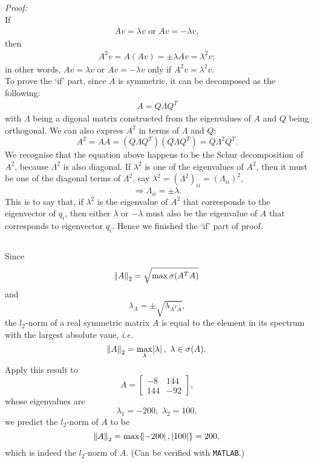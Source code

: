 \documentclass[11pt]{article}
\begin{document}
\subsection{}
\textit{Proof:}\\[0.4cm]
If 
\begin{equation}\begin{split} Av = \lambda v \,\, \text{or}\,\, Av = -\lambda v , \end{split}\nonumber\end{equation}
then
\begin{equation}\begin{split} A^2v=A(Av)=\pm \lambda Av = \lambda^2v;\end{split}\nonumber\end{equation}
in other words, $Av=\lambda v$ or $Av=-\lambda v$ only if $A^2v = \lambda^2v$.\\[0.3cm]
To prove the `if' part, since $A$ is symmetric, it can be decomposed as the following:
\begin{equation}\begin{split} A = Q\Lambda Q^T\end{split}\nonumber\end{equation}
with $\Lambda$ being a digonal matrix constructed from the eigenvalues of $A$ and $Q$ being orthogonal. We can also express $A^2$ in terms of $\Lambda$ and $Q$:
$$A^2 = AA = (Q\Lambda Q^T)(Q\Lambda Q^T) = Q\Lambda^2 Q^T.$$
We recognise that the equation above happens to be the Schur decomposition of $A^2$, because $\Lambda^2$ is also diagonal. If $\lambda^2$ is one of the eigenvalues of $A^2$, then it must be one of the diagonal terms of $\Lambda^2$, say $\lambda^2 = (\Lambda^2)_{ii} = (\Lambda_{ii})^2$, $$\Rightarrow\Lambda_{ii}= \pm\lambda. $$
This is to say that, if $\lambda^2$ is the eigenvalue of $A^2$ that corresponds to the eigenvector of $q_i$, then either $\lambda$ or $-\lambda$ must also be the eigenvalue of $A$ that corresponds to eigenvector $q_i$. Hence we finished the `if' part of proof.

\subsection{}
Since $$\norm{A}_2 = \sqrt{\max\sigma(A^TA)}$$ and $$\lambda_{A} = \pm\sqrt{\lambda_{A^TA}},$$ the $l_2$-norm of a real symmetric matrix $A$ is equal to the element in its spectrum with the largest absolute vaue, \textit{i.e.} $$\norm{A}_2 = \max_{\lambda}\abs{\lambda},\,\,\lambda\in\sigma(A).$$ 
Apply this result to $$A = \begin{bmatrix} -8 & 144\\144 & -92\end{bmatrix}, $$ 
whose eigenvalues are $$\lambda_1 = -200,\,\,\lambda_2 = 100,$$
we predict the $l_2$-norm of $A$ to be 
$$\norm{A}_2 = \max\{\abs{-200},\,\abs{100}\} = 200,$$
which is indeed the $l_2$-norm of $A$. (Can be verified with \texttt{MATLAB}.)
\end{document}
